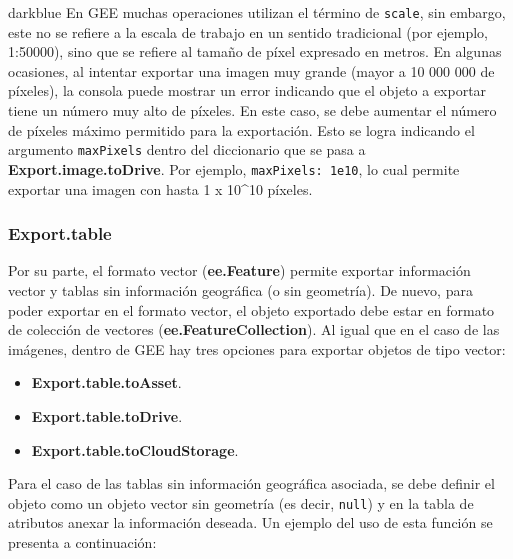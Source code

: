 \documentclass[
  12pt,
  letterpaper,
  twoside]{book}
\providecommand{\tightlist}{%
  \setlength{\itemsep}{0pt}\setlength{\parskip}{0pt}}
\newcommand\boldpurple[1]{\textcolor{darkpurple}{\textbf{#1}}}
\begin{document}
\begin{bluebox2}

\begin{awesomeblock}{5pt}{\faLightbulb}{darkblue}
En GEE muchas operaciones utilizan el término de \texttt{scale}, sin embargo, este no se refiere a la escala de trabajo en un sentido tradicional (por ejemplo, 1:50000), sino que se refiere al tamaño de píxel expresado en metros.
En algunas ocasiones, al intentar exportar una imagen muy grande (mayor a 10 000 000 de píxeles), la consola puede mostrar un error indicando que el objeto a exportar tiene un número muy alto de píxeles. En este caso, se debe aumentar el número de píxeles máximo permitido para la exportación. Esto se logra indicando el argumento \texttt{maxPixels} dentro del diccionario que se pasa a \boldpurple{Export.image.toDrive}. Por ejemplo, \texttt{maxPixels:\ 1e10}, lo cual permite exportar una imagen con hasta 1 x 10\^{}10 píxeles.

\end{awesomeblock}

\end{bluebox2}

\hypertarget{export.table}{%
\subsubsection*{Export.table}\label{export.table}}

Por su parte, el formato vector (\boldpurple{ee.Feature}) permite exportar información vector y tablas sin información geográfica (o sin geometría). De nuevo, para poder exportar en el formato vector, el objeto exportado debe estar en formato de colección de vectores (\boldpurple{ee.FeatureCollection}). Al igual que en el caso de las imágenes, dentro de GEE hay tres opciones para exportar objetos de tipo vector:

\begin{itemize}
\tightlist
\item
  \boldpurple{Export.table.toAsset}.
\item
  \boldpurple{Export.table.toDrive}.
\item
  \boldpurple{Export.table.toCloudStorage}.
\end{itemize}

Para el caso de las tablas sin información geográfica asociada, se debe definir el objeto como un objeto vector sin geometría (es decir, \texttt{null}) y en la tabla de atributos anexar la información deseada. Un ejemplo del uso de esta función se presenta a continuación:
\end{document}
